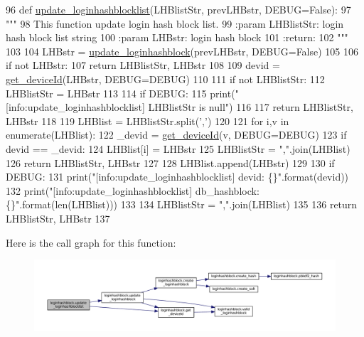 \begin{DoxyCode}
96 \textcolor{keyword}{def }\hyperlink{namespaceloginhashblock_a2bcc7ddd0fcc3788572dd77808cb624d}{update\_loginhashblocklist}(LHBlistStr, prevLHBstr, DEBUG=False):
97     \textcolor{stringliteral}{"""}
98 \textcolor{stringliteral}{    This function update login hash block list.}
99 \textcolor{stringliteral}{    :param LHBlistStr: login hash block list string}
100 \textcolor{stringliteral}{    :param LHBstr: login hash block}
101 \textcolor{stringliteral}{    :return:}
102 \textcolor{stringliteral}{    """}
103 
104     LHBstr = \hyperlink{namespaceloginhashblock_afef75d97c834ce0fda711b93d0b56b00}{update\_loginhashblock}(prevLHBstr, DEBUG=\textcolor{keyword}{False})
105 
106     \textcolor{keywordflow}{if} \textcolor{keywordflow}{not} LHBstr:
107         \textcolor{keywordflow}{return} LHBlistStr, LHBstr
108 
109     devid = \hyperlink{namespaceloginhashblock_a17417f2f6bca76ab51170082a562e5f6}{get\_deviceId}(LHBstr, DEBUG=DEBUG)
110 
111     \textcolor{keywordflow}{if} \textcolor{keywordflow}{not} LHBlistStr:
112         LHBlistStr = LHBstr
113         
114         \textcolor{keywordflow}{if} DEBUG:
115             print(\textcolor{stringliteral}{"[info:update\_loginhashblocklist] LHBlistStr is null"})
116 
117         \textcolor{keywordflow}{return} LHBlistStr, LHBstr
118 
119     LHBlist = LHBlistStr.split(\textcolor{stringliteral}{','})
120 
121     \textcolor{keywordflow}{for} i,v \textcolor{keywordflow}{in} enumerate(LHBlist):
122         \_devid = \hyperlink{namespaceloginhashblock_a17417f2f6bca76ab51170082a562e5f6}{get\_deviceId}(v, DEBUG=DEBUG)
123         \textcolor{keywordflow}{if} devid == \_devid:
124             LHBlist[i] = LHBstr
125             LHBlistStr = \textcolor{stringliteral}{","}.join(LHBlist)
126             \textcolor{keywordflow}{return} LHBlistStr, LHBstr
127 
128     LHBlist.append(LHBstr)
129 
130     \textcolor{keywordflow}{if} DEBUG:
131         print(\textcolor{stringliteral}{"[info:update\_loginhashblocklist] devid: \{\}"}.format(devid))
132         print(\textcolor{stringliteral}{"[info:update\_loginhashblocklist] db\_hashblock: \{\}"}.format(len(LHBlist)))
133 
134     LHBlistStr = \textcolor{stringliteral}{","}.join(LHBlist)
135 
136     \textcolor{keywordflow}{return} LHBlistStr, LHBstr
137 
\end{DoxyCode}


Here is the call graph for this function\+:\nopagebreak
\begin{figure}[H]
\begin{center}
\leavevmode
\includegraphics[width=350pt]{namespaceloginhashblock_a2bcc7ddd0fcc3788572dd77808cb624d_cgraph}
\end{center}
\end{figure}




